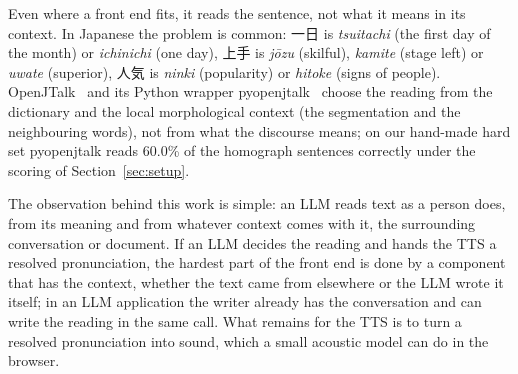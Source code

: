 \documentclass[11pt,a4paper]{article}
\begin{document}
Even where a front end fits, it reads the sentence, not what it means in its context. In Japanese the problem is common: 一日 is
\emph{tsuitachi} (the first day of the month) or \emph{ichinichi} (one day), 上手 is \emph{jōzu} (skilful),
\emph{kamite} (stage left) or \emph{uwate} (superior), 人気 is \emph{ninki} (popularity) or \emph{hitoke} (signs of
people). OpenJTalk~\citep{openjtalk} and its Python wrapper pyopenjtalk~\citep{pyopenjtalk} choose the reading
from the dictionary and the local morphological context (the segmentation and the neighbouring words), not from what
the discourse means; on our hand-made hard set pyopenjtalk reads 60.0\% of the homograph sentences correctly
under the scoring of Section~\ref{sec:setup}.

The observation behind this work is simple: an LLM reads text as a person does, from its meaning and from whatever
context comes with it, the surrounding conversation or document. If an LLM decides the reading and hands the TTS a
resolved pronunciation, the hardest part of the front end is done by a component that has the context, whether the
text came from elsewhere or the LLM wrote it itself; in an LLM application the writer already has the conversation and
can write the reading in the same call. What remains for the TTS is to turn a resolved pronunciation into sound, which
a small acoustic model can do in the browser.
\end{document}
